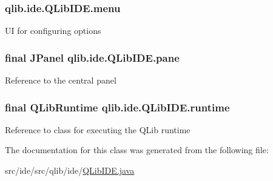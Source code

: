 \subsubsection[{\texorpdfstring{menu}{menu}}]{ qlib.\+ide.\+Q\+Lib\+I\+D\+E.\+menu\hspace{0.3cm}{\ttfamily [private]}}\hypertarget{classqlib_1_1ide_1_1QLibIDE_ae822573114cbc618b4af0ddf3726b06b}{}\label{classqlib_1_1ide_1_1QLibIDE_ae822573114cbc618b4af0ddf3726b06b}
UI for configuring options 
\subsubsection[{\texorpdfstring{pane}{pane}}]{\setlength{\rightskip}{0pt plus 5cm}final J\+Panel qlib.\+ide.\+Q\+Lib\+I\+D\+E.\+pane\hspace{0.3cm}{\ttfamily [private]}}\hypertarget{classqlib_1_1ide_1_1QLibIDE_a599d44725656f74ca6d6fc028b8973a8}{}\label{classqlib_1_1ide_1_1QLibIDE_a599d44725656f74ca6d6fc028b8973a8}
Reference to the central panel 
\subsubsection[{\texorpdfstring{runtime}{runtime}}]{\setlength{\rightskip}{0pt plus 5cm}final {\bf Q\+Lib\+Runtime} qlib.\+ide.\+Q\+Lib\+I\+D\+E.\+runtime\hspace{0.3cm}{\ttfamily [private]}}\hypertarget{classqlib_1_1ide_1_1QLibIDE_a07b6d9558a76bd5d818a98debdb93d5f}{}\label{classqlib_1_1ide_1_1QLibIDE_a07b6d9558a76bd5d818a98debdb93d5f}
Reference to class for executing the Q\+Lib runtime 

The documentation for this class was generated from the following file\+:\begin{DoxyCompactItemize}
\item 
src/ide/src/qlib/ide/\hyperlink{QLibIDE_8java}{Q\+Lib\+I\+D\+E.\+java}\end{DoxyCompactItemize}
